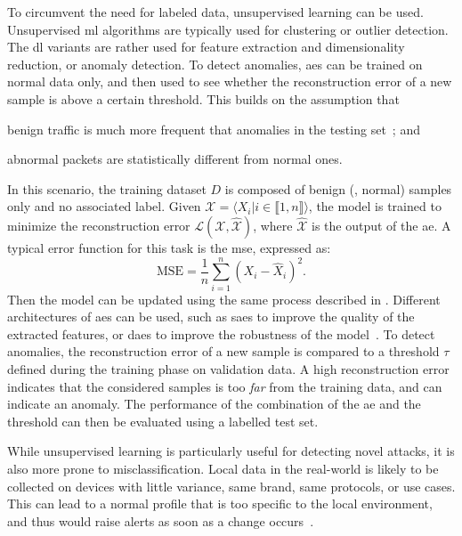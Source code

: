 To circumvent the need for labeled data, unsupervised learning can be used.
Unsupervised \gls{ml} algorithms are typically used for clustering or outlier detection.
The \gls{dl} variants are rather used for feature extraction and dimensionality reduction, or anomaly detection.
To detect anomalies, \glspl{ae} can be trained on normal data only, and then used to see whether the reconstruction error of a new sample is above a certain threshold.
This builds on the assumption that
\begin{enumerate*}[(i)]
  \item benign traffic is much more frequent that anomalies in the testing set~\cite{chandola_Anomalydetectionsurvey_2009}; and
  \item abnormal packets are statistically different from normal ones.
\end{enumerate*}
In this scenario, the training dataset $D$ is composed of benign (\ie, normal) samples only and no associated label.
Given $\mathcal{X} = \langle X_i | i \in \llbracket 1, n \rrbracket \rangle $, the model is trained to minimize the reconstruction error $\mathcal{L}(\mathcal{X}, \hat{\mathcal{X}})$, where $\hat{\mathcal{X}}$ is the output of the \gls{ae}.
A typical error function for this task is the \gls{mse}, expressed as:
\begin{equation}
  \text{MSE} = \frac{1}{n} \sum_{i=1}^{n} \left( X_i - \hat{X}_i \right)^2.
\end{equation}
Then the model can be updated using the same process described in .
Different architectures of \glspl{ae} can be used, such as \glspl{sae} to improve the quality of the extracted features, or \glspl{dae} to improve the robustness of the model~\cite{gjorgiev_TimeSeriesAnomaly_2020}. 
To detect anomalies, the reconstruction error of a new sample is compared to a threshold $\tau$ defined during the training phase on validation data.
A high reconstruction error indicates that the considered samples is too \emph{far} from the training data, and can indicate an anomaly.
The performance of the combination of the \gls{ae} and the threshold can then be evaluated using a labelled test set.

While unsupervised learning is particularly useful for detecting novel attacks, it is also more prone to misclassification.
Local data in the real-world is likely to be collected on devices with little variance, \eg same brand, same protocols, or use cases.
This can lead to a normal profile that is too specific to the local environment, and thus would raise alerts as soon as a change occurs~\cite{liu_MachineLearningDeep_2019}.

